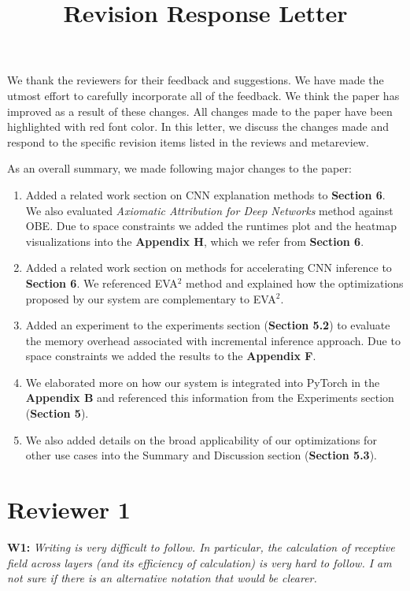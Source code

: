 \documentclass[preprint]{vldb}
\title{Revision Response Letter}
\author{}
\begin{document}
\maketitle

We thank the reviewers for their feedback and suggestions.
We have made the utmost effort to carefully incorporate all of the feedback. 
We think the paper has improved as a result of these changes.
All changes made to the paper have been highlighted with red font color.
In this letter, we discuss the changes made and respond to the specific revision items listed in the reviews and metareview.

As an overall summary, we made following major changes to the paper:
\begin{enumerate}
	\item Added a related work section on CNN explanation methods to \textbf{Section 6}.
	We also evaluated \textit{Axiomatic Attribution for Deep Networks} method against OBE.
	Due to space constraints we added the runtimes plot and the heatmap visualizations into the \textbf{Appendix H}, which we refer from \textbf{Section 6}.
	\item Added a related work section on methods for accelerating CNN inference to \textbf{Section 6}.
	We referenced EVA$^2$ method and explained how the optimizations proposed by our system are complementary to EVA$^2$.
	\item Added an experiment to the experiments section (\textbf{Section 5.2}) to evaluate the memory overhead associated with incremental inference approach. Due to space constraints we added the results to the \textbf{Appendix F}.
	\item We elaborated more on how our system is integrated into PyTorch in the \textbf{Appendix B} and referenced this information from the Experiments section (\textbf{Section 5}).
	\item We also added details on the broad applicability of our optimizations for other use cases into the Summary and Discussion section (\textbf{Section 5.3}).
\end{enumerate}

\section{Reviewer 1}

\vspace{2mm}
\noindent \textbf{W1:} \textit{Writing is very difficult to follow. In particular, the calculation of receptive field across layers (and its efficiency of calculation) is very hard to follow. I am not sure if there is an alternative notation that would be clearer.}
\end{document}
